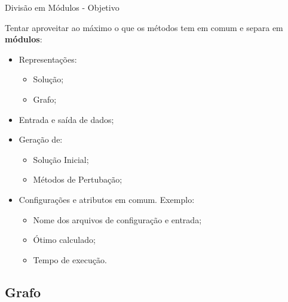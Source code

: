 \documentclass[compress, hide notes]{beamer}
\let\olditem=\item%
\renewcommand{\item}{\olditem \justifying}%
\begin{document}
 \begin{frame}{Divisão em Módulos - Objetivo}

     Tentar aproveitar ao máximo o que os métodos tem em comum e separa em \textbf{módulos}:
     
   
     \begin{itemize}
     
     	\item Representações: 
        
     	\begin{itemize}
			\item Solução;
            
            \item Grafo;
		\end{itemize}
     
     
     	\bigskip
     
       \item Entrada e saída de dados;
     
     	\bigskip
     
       \item Geração de:
       
       \begin{itemize}
			\item Solução Inicial;
            
            \item Métodos de Pertubação;
		\end{itemize}
       
     
     	\bigskip
     
       \item Configurações e atributos em comum. Exemplo:
     
     
       \begin{itemize}
         \item Nome dos arquivos de configuração e entrada;
     
         \item Ótimo calculado;
     
         \item Tempo de execução.
       \end{itemize}
     \end{itemize}
 \end{frame}
 
 
 \subsection{Grafo}
 
\end{document}
